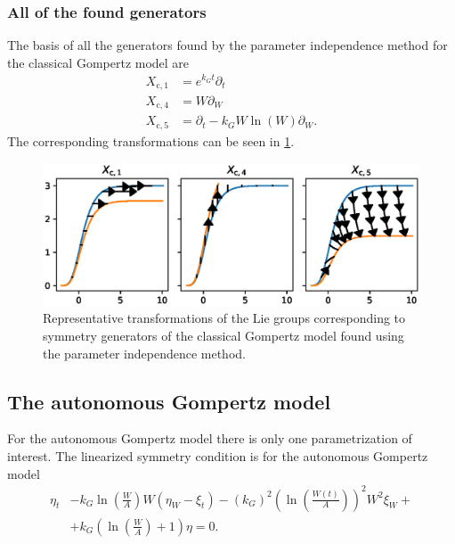 \subsubsection{All of the found generators}
The basis of all the generators found by the parameter independence method for the classical Gompertz model are
\begin{align}
  X_{\text{c},1} &= e^{k_G t} \partial_t \\
  X_{\text{c},4} &= W \partial_W \\
  X_{\text{c},5} &= \partial_t - k_G W \ln(W) \partial_W.
\end{align}
The corresponding transformations can be seen in \cref{fig:gompertz-classical-param}.
\begin{figure}
  \centering
  \includegraphics[width=.95\textwidth]{images/gompertz-classical-param}
  \caption{Representative transformations of the Lie groups corresponding to symmetry generators of the classical Gompertz model found using the parameter independence method.}
  \label{fig:gompertz-classical-param}
\end{figure}


\subsection{The autonomous Gompertz model}

For the autonomous Gompertz model there is only one parametrization of interest.
The linearized symmetry condition  is for the autonomous Gompertz model
\begin{equation}\label{eq:gompertz-autonomous-lin-symmetry-cond}
  \begin{split}
    \eta_t &- k_G \ln(\frac{W}{A}) W\left(\eta_W - \xi_t\right) - (k_G)^2 \left(\ln(\frac{W(t)}{A})\right)^2 W^2 \xi_W +\\ &+ k_G \left(\ln(\frac{W}{A}) + 1\right) \eta = 0.
  \end{split}
\end{equation}

